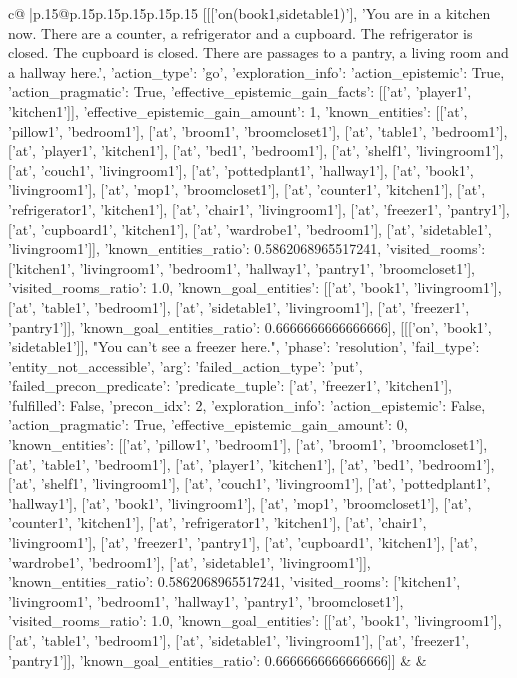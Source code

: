 \documentclass{article}
\begin{document}
{\begin{supertabular}{c@{$\;$}|p{.15\linewidth}@{}p{.15\linewidth}p{.15\linewidth}p{.15\linewidth}p{.15\linewidth}p{.15\linewidth}}
{{{	 [[['on(book1,sidetable1)'], 'You are in a kitchen now. There are a counter, a refrigerator and a cupboard. The refrigerator is closed. The cupboard is closed. There are passages to a pantry, a living room and a hallway here.', {'action_type': 'go', 'exploration_info': {'action_epistemic': True, 'action_pragmatic': True, 'effective_epistemic_gain_facts': [['at', 'player1', 'kitchen1']], 'effective_epistemic_gain_amount': 1, 'known_entities': [['at', 'pillow1', 'bedroom1'], ['at', 'broom1', 'broomcloset1'], ['at', 'table1', 'bedroom1'], ['at', 'player1', 'kitchen1'], ['at', 'bed1', 'bedroom1'], ['at', 'shelf1', 'livingroom1'], ['at', 'couch1', 'livingroom1'], ['at', 'pottedplant1', 'hallway1'], ['at', 'book1', 'livingroom1'], ['at', 'mop1', 'broomcloset1'], ['at', 'counter1', 'kitchen1'], ['at', 'refrigerator1', 'kitchen1'], ['at', 'chair1', 'livingroom1'], ['at', 'freezer1', 'pantry1'], ['at', 'cupboard1', 'kitchen1'], ['at', 'wardrobe1', 'bedroom1'], ['at', 'sidetable1', 'livingroom1']], 'known_entities_ratio': 0.5862068965517241, 'visited_rooms': ['kitchen1', 'livingroom1', 'bedroom1', 'hallway1', 'pantry1', 'broomcloset1'], 'visited_rooms_ratio': 1.0, 'known_goal_entities': [['at', 'book1', 'livingroom1'], ['at', 'table1', 'bedroom1'], ['at', 'sidetable1', 'livingroom1'], ['at', 'freezer1', 'pantry1']], 'known_goal_entities_ratio': 0.6666666666666666}}], [[['on', 'book1', 'sidetable1']], "You can't see a freezer here.", {'phase': 'resolution', 'fail_type': 'entity_not_accessible', 'arg': {'failed_action_type': 'put', 'failed_precon_predicate': {'predicate_tuple': ['at', 'freezer1', 'kitchen1'], 'fulfilled': False, 'precon_idx': 2}}, 'exploration_info': {'action_epistemic': False, 'action_pragmatic': True, 'effective_epistemic_gain_amount': 0, 'known_entities': [['at', 'pillow1', 'bedroom1'], ['at', 'broom1', 'broomcloset1'], ['at', 'table1', 'bedroom1'], ['at', 'player1', 'kitchen1'], ['at', 'bed1', 'bedroom1'], ['at', 'shelf1', 'livingroom1'], ['at', 'couch1', 'livingroom1'], ['at', 'pottedplant1', 'hallway1'], ['at', 'book1', 'livingroom1'], ['at', 'mop1', 'broomcloset1'], ['at', 'counter1', 'kitchen1'], ['at', 'refrigerator1', 'kitchen1'], ['at', 'chair1', 'livingroom1'], ['at', 'freezer1', 'pantry1'], ['at', 'cupboard1', 'kitchen1'], ['at', 'wardrobe1', 'bedroom1'], ['at', 'sidetable1', 'livingroom1']], 'known_entities_ratio': 0.5862068965517241, 'visited_rooms': ['kitchen1', 'livingroom1', 'bedroom1', 'hallway1', 'pantry1', 'broomcloset1'], 'visited_rooms_ratio': 1.0, 'known_goal_entities': [['at', 'book1', 'livingroom1'], ['at', 'table1', 'bedroom1'], ['at', 'sidetable1', 'livingroom1'], ['at', 'freezer1', 'pantry1']], 'known_goal_entities_ratio': 0.6666666666666666}}]] 
	  } 
	   } 
	   } 
	 & & \\ 
 


\end{supertabular}}
\end{document}
